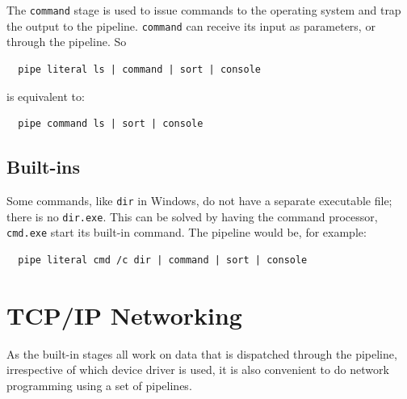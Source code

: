 The \texttt{command} stage is used to issue commands to the operating
system and trap the output to the pipeline. \texttt{command} can
receive its input as parameters, or through the pipeline. So
\begin{lstlisting}
  pipe literal ls | command | sort | console
\end{lstlisting}
is equivalent to:
\begin{lstlisting}
  pipe command ls | sort | console
\end{lstlisting}


\section{Built-ins}
Some commands, like \texttt{dir} in Windows, do not have a separate
executable file; there is no \texttt{dir.exe}. This can be solved by
having the command processor, \texttt{cmd.exe} start its built-in
command. The pipeline would be, for example:
\begin{lstlisting}
  pipe literal cmd /c dir | command | sort | console
\end{lstlisting}
\chapter{TCP/IP Networking}
As the built-in stages all work on data that is dispatched through the
pipeline, irrespective of which device driver is used, it is also
convenient to do network programming using a set of pipelines.

